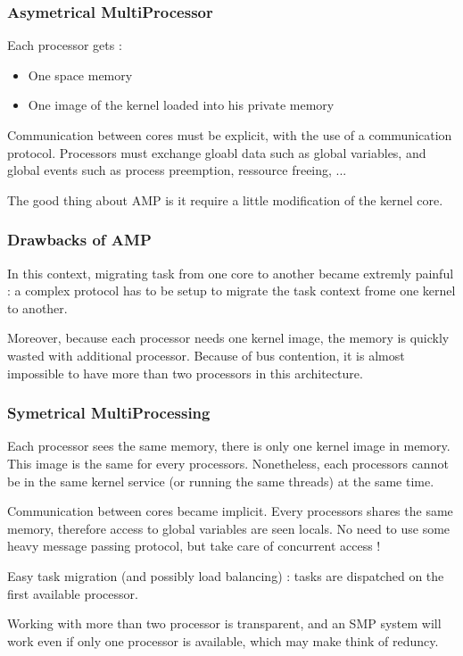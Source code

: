 
\begin{frame}
\frametitle{Asymetrical MultiProcessor}

Each processor gets :
\begin{itemize}
\item
One space memory
\item
One image of the kernel loaded into his private memory
\end{itemize}

\-

Communication between cores must be explicit, with the use of a communication protocol. Processors must exchange gloabl data such as global variables, and global events such as process preemption, ressource freeing, ...

\-

The good thing about AMP is it require a little modification of the kernel core.

\end{frame}


\begin{frame}
\frametitle{Drawbacks of AMP}

In this context, migrating task from one core to another became extremly painful : a complex protocol has to be setup to migrate the task context frome one kernel to another.

\-

Moreover, because each processor needs one kernel image, the memory is quickly wasted with additional processor. Because of bus contention, it is almost impossible to have more than two processors in this architecture.

\end{frame}


\begin{frame}
\frametitle{Symetrical MultiProcessing}

Each processor sees the same memory, there is only one kernel image in memory. This image is the same for every processors. Nonetheless, each processors cannot be in the same kernel service (or running the same threads) at the same time.

\-

Communication between cores became implicit. Every processors shares the same memory, therefore access to global variables are seen locals. No need to use some heavy message passing protocol, but take care of concurrent access !

\-

Easy task migration (and possibly load balancing) : tasks are dispatched on the first available processor.

\-

Working with more than two processor is transparent, and an SMP system will work even if only one processor is available, which may make think of reduncy.

\end{frame}

